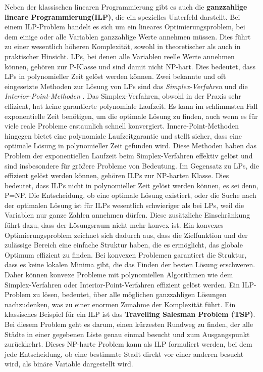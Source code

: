 \documentclass[bachelor, german]{algothesis}
\begin{document}
Neben der klassischen linearen Programmierung gibt es auch die \textbf{ganzzahlige lineare Programmierung(ILP)}, die ein spezielles Unterfeld darstellt. Bei einem ILP-Problem handelt es sich um ein lineares Optimierungsproblem, bei dem einige oder alle Variablen ganzzahlige Werte annehmen müssen. Dies führt zu einer wesentlich höheren Komplexität, sowohl in theoretischer als auch in praktischer Hinsicht.\newline
LPs, bei denen alle Variablen reelle Werte annehmen können, gehören zur P-Klasse und sind damit nicht NP-hart. Dies bedeutet, dass LPs in polynomieller Zeit gelöst werden können. Zwei bekannte und oft eingesetzte Methoden zur Lösung von LPs sind das \emph{Simplex-Verfahren} und die \emph{Interior-Point-Methoden} \cite{LinearProg}.  Das Simplex-Verfahren, obwohl in der Praxis sehr effizient, hat keine garantierte polynomiale Laufzeit. Es kann im schlimmsten Fall exponentielle Zeit benötigen, um die optimale Lösung zu finden, auch wenn es für viele reale Probleme erstaunlich schnell konvergiert. Innere-Point-Methoden hingegen bietet eine polynomiale Laufzeitgarantie und stellt sicher, dass eine optimale Lösung in polynomieller Zeit gefunden wird. Diese Methoden haben das Problem der exponentiellen Laufzeit beim Simplex-Verfahren effektiv gelöst und sind insbesondere für größere Probleme von Bedeutung.\newline
Im Gegensatz zu LPs, die effizient gelöst werden können, gehören ILPs zur NP-harten Klasse. Dies bedeutet, dass ILPs nicht in polynomieller Zeit gelöst werden können, es sei denn, P=NP. Die Entscheidung, ob eine optimale Lösung existiert, oder die Suche nach der optimalen Lösung ist für ILPs wesentlich schwieriger als bei LPs, weil die Variablen nur ganze Zahlen annehmen dürfen. Diese zusätzliche Einschränkung führt dazu, dass der Lösungsraum nicht mehr konvex ist. Ein konvexes Optimierungsproblem zeichnet sich dadurch aus, dass die Zielfunktion und der zulässige Bereich eine einfache Struktur haben, die es ermöglicht, das globale Optimum effizient zu finden. Bei konvexen Problemen garantiert die Struktur, dass es keine lokalen Minima gibt, die das Finden der besten Lösung erschweren. Daher können konvexe Probleme mit polynomiellen Algorithmen wie dem Simplex-Verfahren oder Interior-Point-Verfahren effizient gelöst werden. Ein ILP-Problem zu lösen, bedeutet, über alle möglichen ganzzahligen Lösungen nachzudenken, was zu einer enormen Zunahme der Komplexität führt.\newline
Ein klassisches Beispiel für ein ILP ist das \textbf{Travelling Salesman Problem (TSP)}. Bei diesem Problem geht es darum, einen kürzesten Rundweg zu finden, der alle Städte in einer gegebenen Liste genau einmal besucht und zum Ausgangspunkt zurückkehrt. Dieses NP-harte Problem kann als ILP formuliert werden, bei dem jede Entscheidung, ob eine bestimmte Stadt direkt vor einer anderen besucht wird, als binäre Variable dargestellt wird.\newline
\end{document}
